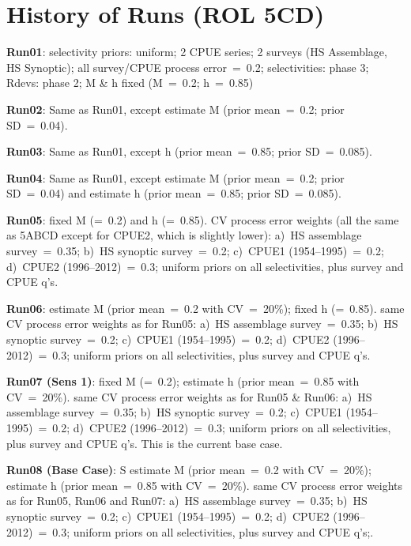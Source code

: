 
\section*{History of Runs (ROL 5CD)}

{\bf Run01}: selectivity priors: uniform; 2 CPUE series; 2 surveys (HS Assemblage, HS Synoptic); all survey/CPUE process error~=~0.2; selectivities: phase 3; Rdevs: phase 2; M \& h fixed (M~=~0.2; h~=~0.85) \newline  

{\bf Run02}: Same as Run01, except estimate M (prior mean~=~0.2; prior SD~=~0.04). \newline

{\bf Run03}: Same as Run01, except h (prior mean~=~0.85; prior SD~=~0.085). \newline

{\bf Run04}: Same as Run01,  except estimate M (prior mean~=~0.2; prior SD~=~0.04) and estimate h (prior mean~=~0.85; prior SD~=~0.085). \newline

{\bf Run05}: fixed M (=~0.2) and h (=~0.85).  CV process error weights (all the same as 5ABCD except for CPUE2, which is slightly lower): a)~HS assemblage survey~=~0.35; b)~HS synoptic survey~=~0.2; c)~CPUE1 (1954--1995)~=~0.2; d)~CPUE2 (1996--2012)~=~0.3; uniform priors on all selectivities, plus survey and CPUE q's. \newline

{\bf Run06}: estimate M (prior mean~=~0.2 with CV~=~20\%); fixed h (=~0.85).  same CV process error weights as for Run05: a)~HS assemblage survey~=~0.35; b)~HS synoptic survey~=~0.2; c)~CPUE1 (1954--1995)~=~0.2; d)~CPUE2 (1996--2012)~=~0.3; uniform priors on all selectivities, plus survey and CPUE q's. \newline

{\bf Run07 (Sens 1)}: fixed M (=~0.2); estimate h (prior mean~=~0.85 with CV~=~20\%).  same CV process error weights as for Run05 \& Run06: a)~HS assemblage survey~=~0.35; b)~HS synoptic survey~=~0.2; c)~CPUE1 (1954--1995)~=~0.2; d)~CPUE2 (1996--2012)~=~0.3; uniform priors on all selectivities, plus survey and CPUE q's.  This is the current base case. \newline

{\bf Run08 (Base Case)}: S estimate M (prior mean~=~0.2 with CV~=~20\%); estimate h (prior mean~=~0.85 with CV~=~20\%).  same CV process error weights as for Run05, Run06 and Run07: a)~HS assemblage survey~=~0.35; b)~HS synoptic survey~=~0.2; c)~CPUE1 (1954--1995)~=~0.2; d)~CPUE2 (1996--2012)~=~0.3; uniform priors on all selectivities, plus survey and CPUE q's;. \newline

